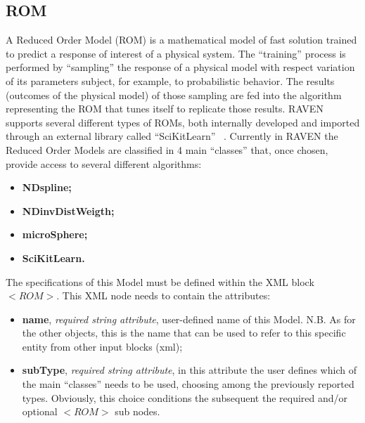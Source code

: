 \subsection{ROM}
\label{subsec:models_ROM}
A Reduced Order Model (ROM) is a mathematical model of fast solution trained to predict a response of interest of a physical system. The ``training'' process is performed by “sampling” the response of a physical model with respect variation of its parameters subject, for example, to probabilistic behavior. The results (outcomes of the physical model) of those sampling are fed into the algorithm representing the ROM that tunes itself to replicate those results.
RAVEN supports several different types of ROMs, both internally developed and imported through an external library called ``SciKitLearn'' ~\cite{SciKitLearn}. Currently in RAVEN the Reduced Order Models are classified in 4 main ``classes'' that, once chosen, provide access to several different algorithms:
\begin{itemize}
   \item \textbf{NDspline;}
   \item \textbf{NDinvDistWeigth;}
   \item \textbf{microSphere;}
   \item \textbf{SciKitLearn.}
\end{itemize}
The specifications of this Model must be defined within the XML block $<ROM>$. This XML node needs to contain the attributes:
\vspace{-5mm}
\begin{itemize}
\itemsep0em
\item \textbf{name}, \textit{required string attribute}, user-defined name of this Model. N.B. As for the other objects, this is the name that can be used to refer to this specific entity from other input blocks (xml);
\item \textbf{subType}, \textit{required string attribute}, in this attribute the user defines which of the main ``classes'' needs to be used, choosing among the previously reported types. Obviously, this choice conditions the subsequent the required and/or optional $<ROM>$ sub nodes.
\end{itemize}
\vspace{-5mm}


